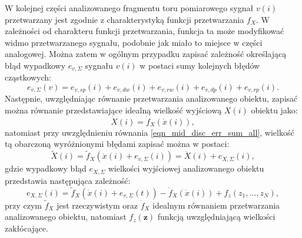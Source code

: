 W kolejnej części analizowanego fragmentu toru pomiarowego sygnał $v(i)$ przetwarzany jest zgodnie z charakterystyką funkcji przetwarzania $f_{X}$. W zależności od charakteru funkcji przetwarzania, funkcja ta może modyfikować widmo przetwarzanego sygnału, podobnie jak miało to miejsce w części analogowej. Można zatem w ogólnym przypadku zapisać zależność określającą błąd wypadkowy $e_{v,\Sigma}$ sygnału $v(i)$ w postaci sumy kolejnych błędów cząstkowych:
\begin{equation}
e_{v,\Sigma} \left( v \right) = e_{v,sp} \left( i \right) + e_{v,dw} \left( i \right) + e_{v,rw} \left( i \right) + e_{v,dp} \left( i \right) + e_{v,rp} \left( i \right) \label{eqn_mid_disc_err_sum_all}.
\end{equation}
Następnie, uwzględniając równanie przetwarzania analizowanego obiektu, zapisać można równanie przedstawiające idealną wielkość wyjściową $X(i)$ obiektu jako:
\begin{equation}
\dot{X} \left( i \right) = \dot{f}_{X} \left( \dot{x} \left( i \right) \right) \label{eqn_out_disc_ideal_all},
\end{equation}
natomiast przy uwzględnieniu równania \eqref{eqn_mid_disc_err_sum_all}, wielkość tą obarczoną wyróżnionymi błędami zapisać można w postaci:
\begin{equation}
\tilde{X} \left( i \right) = \tilde{f}_{X} \left( \dot{x} \left( i \right) + e_{v,\Sigma} \left( i \right) \right) = \dot{X} \left( i \right) + e_{X,\Sigma} \left( i \right) \label{eqn_out_disc_real_all},
\end{equation}
gdzie wypadkowy błąd $e_{X,\Sigma}$ wielkości wyjściowej analizowanego obiektu przedstawia następująca zależność:
\begin{equation}
e_{X,\Sigma} \left( i \right) = \tilde{f}_{X} \left( \dot{x} \left( i \right) + e_{v,\Sigma} \left( t \right) \right) - \dot{f}_{X} \left( \dot{x} \left( i \right) \right) + f_{z} \left( z_{1}, \hdots, z_{N} \right) \label{eqn_out_disc_err_sum_all},
\end{equation}
przy czym $\tilde{f}_{X}$ jest rzeczywistym oraz $\dot{f}_{X}$ idealnym równaniem przetwarzania analizowanego obiektu, natomiast $f_{z}(\mathbf{z})$ funkcją uwzględniającą wielkości zakłócające.

